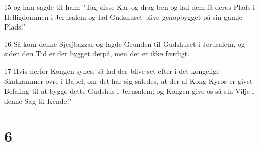 \par 15 og han sagde til ham: "Tag disse Kar og drag ben og lad dem få deres Plads i Helligdommen i Jerusalem og lad Gudshuset blive genopbygget på sin gamle Plads!"
\par 16 Så kom denne Sjesjbazzar og lagde Grunden til Gudshuset i Jerusalem, og siden den Tid er der bygget derpå, men det er ikke færdigt.
\par 17 Hvis derfor Kongen synes, så lad der blive set efter i det kongelige Skatkammer ovre i Babel, om det har sig således, at der af Kong Kyros er givet Befaling til at bygge dette Gudshus i Jerusalem; og Kongen give os så sin Vilje i denne Sag til Kende!"

\chapter{6}

